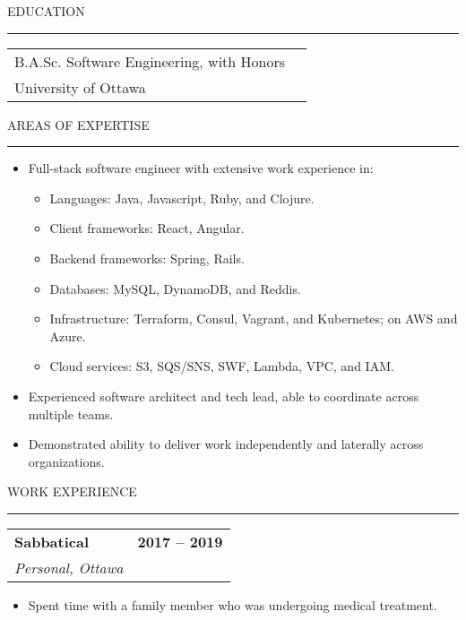 \documentclass[12pt]{article}
\makeatletter
\newenvironment{justifycolumns}
{\begin{tabular*}{\textwidth}{@{\extracolsep{\fill}}lr@{}}}
{\end{tabular*}}
\newcommand{\row}[2]{#1 & #2 \\}
\newcommand{\rowheading}[2]{\row{\textbf{#1}}{\textbf{#2}}}
\newcommand{\range}[2]{#1 -- #2}
\newcommand{\blockseparation}{\vspace{0.13in}}
\newcommand{\heading}[1]{
	\vspace{0.05in}
	\uppercase{#1}
	\vspace{0.05in}
	\hrule
	\blockseparation
}
\newenvironment{tightbullets}
{\begin{itemize}}
{\end{itemize}}
\newenvironment{bullets}
{\begin{tightbullets}}
{\end{tightbullets} \blockseparation}
\makeatother
\begin{document}
\begin{flushleft}
\pagebreak

\heading{Education}

\begin{justifycolumns}
	\row{B.A.Sc. Software Engineering, with Honors}{}
	\row{University of Ottawa}{}
\end{justifycolumns}

\heading{Areas of Expertise}

\begin{bullets}
	\item Full-stack software engineer with extensive work experience in:

	\begin{tightbullets}
		\item Languages: Java, Javascript, Ruby, and Clojure.
		\item Client frameworks: React, Angular.
		\item Backend frameworks: Spring, Rails.
		\item Databases: MySQL, DynamoDB, and Reddis.
		\item Infrastructure: Terraform, Consul, Vagrant, and Kubernetes; on AWS and Azure.
		\item Cloud services: S3, SQS/SNS, SWF, Lambda, VPC, and IAM.
	\end{tightbullets}

	\item Experienced software architect and tech lead, able to coordinate across multiple teams.
	\item Demonstrated ability to deliver work independently and laterally across organizations.
\end{bullets}


\heading{Work Experience}

\begin{justifycolumns}
	\rowheading{Sabbatical}{\range{2017}{2019}}
	\row{\emph{Personal, Ottawa}}{}
\end{justifycolumns}
\begin{bullets}
	\item Spent time with a family member who was undergoing medical treatment.
\end{bullets}


\end{flushleft}
\end{document}
